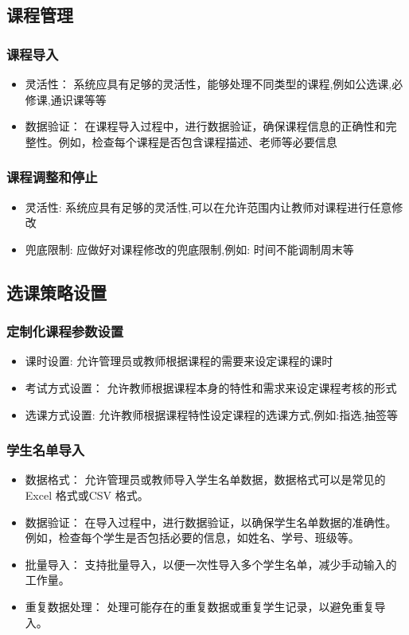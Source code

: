 \documentclass{article}
\begin{document}
\subsection{课程管理}
\subsubsection{课程导入}
\begin{itemize}
  \item 灵活性： 系统应具有足够的灵活性，能够处理不同类型的课程,例如公选课,必修课,通识课等等
  \item 数据验证： 在课程导入过程中，进行数据验证，确保课程信息的正确性和完整性。例如，检查每个课程是否包含课程描述、老师等必要信息
\end{itemize}
\subsubsection{课程调整和停止}
\begin{itemize}
  \item 灵活性: 系统应具有足够的灵活性,可以在允许范围内让教师对课程进行任意修改
  \item 兜底限制: 应做好对课程修改的兜底限制,例如: 时间不能调制周末等
\end{itemize}

\subsection{选课策略设置}
\subsubsection{定制化课程参数设置}
\begin{itemize}
  \item 课时设置: 允许管理员或教师根据课程的需要来设定课程的课时
  \item 考试方式设置： 允许教师根据课程本身的特性和需求来设定课程考核的形式
  \item 选课方式设置: 允许教师根据课程特性设定课程的选课方式,例如:指选,抽签等
\end{itemize}
\subsubsection{学生名单导入}
\begin{itemize}
  \item 数据格式： 允许管理员或教师导入学生名单数据，数据格式可以是常见的 Excel 格式或CSV 格式。
  \item 数据验证： 在导入过程中，进行数据验证，以确保学生名单数据的准确性。例如，检查每个学生是否包括必要的信息，如姓名、学号、班级等。
  \item 批量导入： 支持批量导入，以便一次性导入多个学生名单，减少手动输入的工作量。
  \item 重复数据处理： 处理可能存在的重复数据或重复学生记录，以避免重复导入。
\end{itemize}
\end{document}
